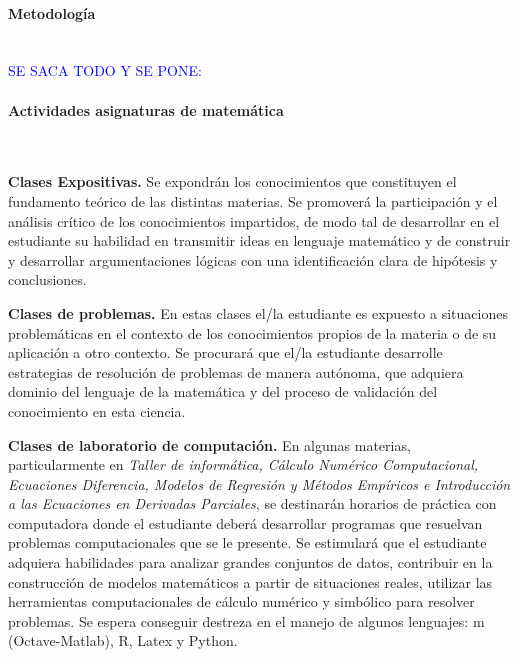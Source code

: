 \documentclass[a4paper, 12pt]{article}
\begin{document}
\paragraph{Metodología} \mbox{}\\


\textcolor{blue}{SE SACA TODO Y SE PONE:}


\paragraph{Actividades asignaturas de matemática}\mbox{}\\

 

\begin{description}

\item{ \textbf{Clases Expositivas.}} Se expondrán los conocimientos  que constituyen el   
fundamento teórico de las distintas materias. Se promoverá la participación  y el análisis crítico de los conocimientos impartidos, de modo tal de desarrollar en el estudiante su habilidad en transmitir ideas en lenguaje matemático y de construir y desarrollar argumentaciones lógicas con una identificación clara
de hipótesis y conclusiones.



\item{\textbf{Clases de problemas.}} En estas clases el/la estudiante es expuesto a situaciones problemáticas en el contexto de los conocimientos propios de la   materia o de su aplicación a otro   contexto. Se procurará que el/la estudiante desarrolle estrategias de resolución de  problemas de manera autónoma, que adquiera dominio del lenguaje de la matemática y del proceso de validación del conocimiento en esta ciencia. 

\item{\textbf{Clases de laboratorio de computación.}} En algunas materias, particularmente en  \emph{ Taller de informática, Cálculo
 Numérico Computacional, Ecuaciones Diferencia,   Modelos de Regresión y Métodos Empíricos e Introducción a las Ecuaciones en Derivadas
Parciales}, se destinarán horarios de práctica con computadora donde el estudiante deberá desarrollar programas que resuelvan problemas computacionales que se le presente. Se estimulará que el estudiante adquiera habilidades para analizar grandes conjuntos de datos, contribuir en la construcción de modelos matemáticos a partir de situaciones reales, utilizar las herramientas computacionales de cálculo numérico y simbólico para resolver problemas. Se espera conseguir destreza en el manejo de algunos lenguajes: m (Octave-Matlab), R, Latex y Python. 






\end{description}
\end{document}
